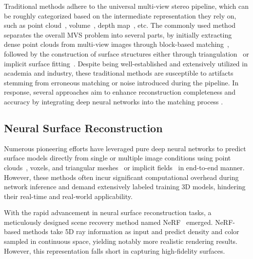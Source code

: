 \documentclass[lettersize,journal]{IEEEtran}
\begin{document}
Traditional methods adhere to the universal multi-view stereo pipeline, which can be roughly categorized based on the intermediate representation they rely on, such as point cloud~\cite{lhuillier2005quasi, Accurate}, volume~\cite{kutulakos2000theory}, depth map~\cite{schoenberger2016mvs, campbell2008using, galliani2015massively}, etc. The commonly used method separates the 
overall MVS problem into several parts, by initially extracting dense point clouds from multi-view images through block-based matching~\cite{barnes2009patchmatch}, followed by the construction of surface structures either through triangulation~\cite{cazals2006delaunay} or implicit surface fitting~\cite{kazhdan2006poisson, kazhdan2013screened}. Despite being well-established and extensively utilized in academia and industry, these traditional methods are susceptible to artifacts stemming from erroneous matching or noise introduced during the pipeline. In response, several approaches aim to enhance reconstruction completeness and accuracy by integrating deep neural networks into the matching process \cite{wang2021patchmatchnet, sarlin2019coarse}.

\subsection{Neural Surface Reconstruction}

Numerous pioneering efforts have leveraged pure deep neural networks to predict surface models directly from single or multiple image conditions using point clouds~\cite{Fan:2017:Point, Lin:2018:Learning}, voxels\cite{Choy:2016:3d, Xie:2019:Pix2vox}, and triangular meshes~\cite{Wang:2018:Pixel2mesh, li2020saliency} or implicit fields~\cite{Park:2019:Deepsdf, Mescheder:2019:Occupancy} in end-to-end manner. However, these methods often incur significant computational overhead during network inference and demand extensively labeled training 3D models, hindering their real-time and real-world applicability.


With the rapid advancement in neural surface reconstruction tasks, a meticulously designed scene recovery method named NeRF~\cite{mildenhall2021nerf} emerged. NeRF-based methods take 5D ray information as input and predict density and color sampled in continuous space, yielding notably more realistic rendering results. However, this representation falls short in capturing high-fidelity surfaces.
\end{document}
